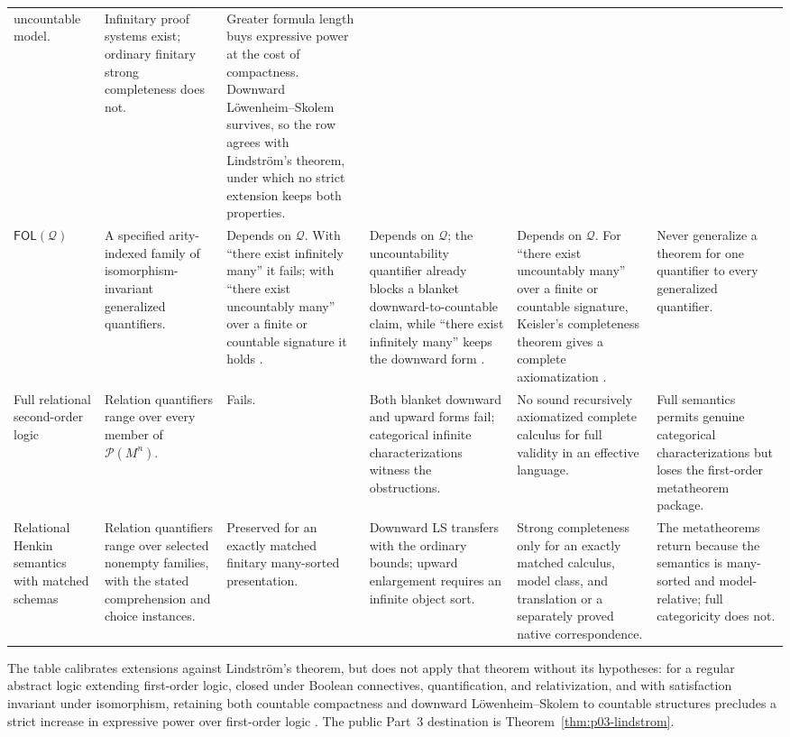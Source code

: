 \begin{landscape}
\begin{longtable}{@{}p{.85in}p{1.25in}p{.80in}p{1.05in}p{1.55in}p{1.55in}@{}}
uncountable model. &
Infinitary proof systems exist; ordinary finitary strong completeness does not. &
Greater formula length buys expressive power at the cost of compactness.
Downward L\"owenheim--Skolem survives, so the row agrees with
Lindstr\"om's theorem, under which no strict extension keeps both
properties. \\
\addlinespace
\(\mathsf{FOL}(\mathcal Q)\) &
A specified arity-indexed family of isomorphism-invariant generalized quantifiers. &
Depends on \(\mathcal Q\).  With ``there exist infinitely many'' it fails;
with ``there exist uncountably many'' over a finite or countable signature it
holds
\cite[ch.~A.1, \S\S5.5--5.6, pp.~44--45]{Barwise1977FirstOrder}. &
Depends on \(\mathcal Q\); the uncountability quantifier already blocks a blanket
downward-to-countable claim, while ``there exist infinitely many'' keeps the
downward form
\cite[ch.~A.1, \S5.6, p.~45]{Barwise1977FirstOrder}. &
Depends on \(\mathcal Q\).  For ``there exist uncountably many'' over a finite
or countable signature, Keisler's completeness theorem gives a complete
axiomatization
\cite[ch.~A.1, \S5.5, p.~44]{Barwise1977FirstOrder}. &
Never generalize a theorem for one quantifier to every generalized quantifier. \\
\addlinespace
Full relational second-order logic &
Relation quantifiers range over every member of \(\mathcal P(M^n)\). &
Fails. &
Both blanket downward and upward forms fail; categorical infinite
characterizations witness the obstructions. &
No sound recursively axiomatized complete calculus for full validity in an
effective language. &
Full semantics permits genuine categorical characterizations but loses the
first-order metatheorem package. \\
\addlinespace
Relational Henkin semantics with matched schemas &
Relation quantifiers range over selected nonempty families, with the stated
comprehension and choice instances. &
Preserved for an exactly matched finitary many-sorted presentation. &
Downward LS transfers with the ordinary bounds; upward enlargement requires
an infinite object sort. &
Strong completeness only for an exactly matched calculus, model class, and
translation or a separately proved native correspondence. &
The metatheorems return because the semantics is many-sorted and
model-relative; full categoricity does not. \\
\bottomrule
\end{longtable}
\endgroup
\end{landscape}

The table calibrates extensions against Lindstr\"om's theorem, but does not
apply that theorem without its hypotheses: for a regular abstract logic
extending first-order logic, closed under Boolean connectives, quantification,
and relativization, and with satisfaction invariant under isomorphism,
retaining both countable compactness and downward L\"owenheim--Skolem to
countable structures precludes a strict increase in expressive power over
first-order logic \cite{Lindstrom1969}.  The public Part~3 destination is
Theorem~\ref{thm:p03-lindstrom}.

